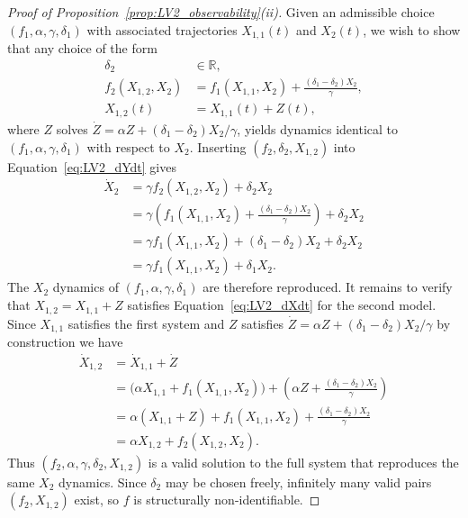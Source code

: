 \documentclass{article}
\theoremstyle{plain}
\theoremstyle{definition}
\begin{document}
{\begin{proof}[Proof of Proposition~\ref{prop:LV2_observability}(ii)]
Given an admissible choice $(f_1, \alpha, \gamma, \delta_1)$ with associated trajectories $X_{1,1}(t)$ and $X_2(t)$, we wish to show that any choice of the form
\begin{align*}
    \delta_2    &\in \mathbb{R}, \\
    f_2(X_{1,2}, X_2) &= f_1(X_{1,1}, X_2) + \frac{(\delta_1 - \delta_2)X_2}{\gamma}, \\
    X_{1,2}(t)      &= X_{1,1}(t) + Z(t),
\end{align*}
where $Z$ solves $\dot{Z} = \alpha Z + (\delta_1 - \delta_2)X_2/\gamma$, yields dynamics identical to $(f_1, \alpha, \gamma, \delta_1)$ with respect to $X_2$. Inserting $(f_2, \delta_2, X_{1,2})$ into Equation~\eqref{eq:LV2_dYdt} gives
\begin{align*}
    \dot{X}_2 &= \gamma f_2(X_{1,2}, X_2) + \delta_2 X_2 \\
            &= \gamma\!\left(f_1(X_{1,1}, X_2) + \frac{(\delta_1 - \delta_2)X_2}{\gamma}\right) + \delta_2 X_2 \\
            &= \gamma f_1(X_{1,1}, X_2) + (\delta_1 - \delta_2)X_2 + \delta_2 X_2 \\
            &= \gamma f_1(X_{1,1}, X_2) + \delta_1 X_2.
\end{align*}
The $X_2$ dynamics of $(f_1, \alpha, \gamma, \delta_1)$ are therefore reproduced. It remains to verify that $X_{1,2} = X_{1,1} + Z$ satisfies Equation~\eqref{eq:LV2_dXdt} for the second model. Since $X_{1,1}$ satisfies the first system and $Z$ satisfies $\dot{Z} = \alpha Z + (\delta_1 - \delta_2)X_2/\gamma$ by construction we have
\begin{align*}
    \dot{X}_{1,2} &= \dot{X}_{1,1} + \dot{Z} \\
              &= \bigl(\alpha X_{1,1} + f_1(X_{1,1}, X_2)\bigr) + \left(\alpha Z + \frac{(\delta_1 - \delta_2)X_2}{\gamma}\right) \\
              &= \alpha(X_{1,1} + Z) + f_1(X_{1,1}, X_2) + \frac{(\delta_1 - \delta_2)X_2}{\gamma} \\
              &= \alpha X_{1,2} + f_2(X_{1,2}, X_2).
\end{align*}
Thus $(f_2, \alpha, \gamma, \delta_2, X_{1,2})$ is a valid solution to the full system that reproduces the same $X_2$ dynamics. Since $\delta_2$ may be chosen freely, infinitely many valid pairs $(f_2, X_{1,2})$ exist, so $f$ is structurally non-identifiable.
\end{proof}

}
\end{document}

